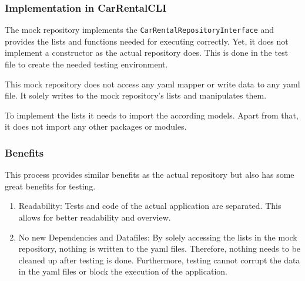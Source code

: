 \subsubsection*{Implementation in CarRentalCLI}
The mock repository implements the \texttt{CarRentalRepositoryInterface} and provides the lists and functions needed for executing correctly.
Yet, it does not implement a constructor as the actual repository does.
This is done in the test file to create the needed testing environment.

This mock repository does not access any yaml mapper or write data to any yaml file.
It solely writes to the mock repository's lists and manipulates them.

To implement the lists it needs to import the according models.
Apart from that, it does not import any other packages or modules.

\subsubsection*{Benefits}
This process provides similar benefits as the actual repository but also has some great benefits for testing.
\begin{enumerate}
    \item Readability: Tests and code of the actual application are separated.
          This allows for better readability and overview.
    \item No new Dependencies and Datafiles: By solely accessing the lists in the mock repository, nothing is written to the yaml files.
          Therefore, nothing needs to be cleaned up after testing is done.
          Furthermore, testing cannot corrupt the data in the yaml files or block the execution of the application.
\end{enumerate}
